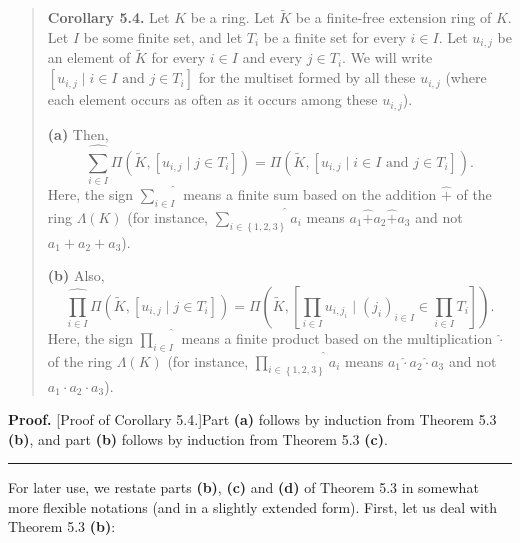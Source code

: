 \documentclass[numbers=enddot,12pt,final,onecolumn,notitlepage]{scrartcl}%
\newenvironment{proof}[1][Proof]{\noindent\textbf{#1.} }{\ \rule{0.5em}{0.5em}}
\begin{document}
\begin{quote}
\textbf{Corollary 5.4.} Let $K$ be a ring. Let $\widetilde{K}$ be a
finite-free extension ring of $K$. Let $I$ be some finite set, and let $T_{i}$
be a finite set for every $i\in I$. Let $u_{i,j}$ be an element of
$\widetilde{K}$ for every $i\in I$ and every $j\in T_{i}$. We will write
$\left[  u_{i,j}\mid i\in I\text{ and }j\in T_{i}\right]  $ for the multiset
formed by all these $u_{i,j}$ (where each element occurs as often as it occurs
among these $u_{i,j}$).

\textbf{(a)} Then,%
\[
\widehat{\sum_{i\in I}}\Pi\left(  \widetilde{K},\left[  u_{i,j}\mid j\in
T_{i}\right]  \right)  =\Pi\left(  \widetilde{K},\left[  u_{i,j}\mid i\in
I\text{ and }j\in T_{i}\right]  \right)  .
\]
Here, the sign $\widehat{\sum\limits_{i\in I}}$ means a finite sum based on
the addition $\widehat{+}$ of the ring $\Lambda\left(  K\right)  $ (for
instance, $\widehat{\sum\limits_{i\in\left\{  1,2,3\right\}  }}a_{i}$ means
$a_{1}\widehat{+}a_{2}\widehat{+}a_{3}$ and not $a_{1}+a_{2}+a_{3}$).

\textbf{(b)} Also,%
\[
\widehat{\prod_{i\in I}}\Pi\left(  \widetilde{K},\left[  u_{i,j}\mid j\in
T_{i}\right]  \right)  =\Pi\left(  \widetilde{K},\left[  \prod_{i\in
I}u_{i,j_{i}}\mid\left(  j_{i}\right)  _{i\in I}\in\prod_{i\in I}T_{i}\right]
\right)  .
\]
Here, the sign $\widehat{\prod\limits_{i\in I}}$ means a finite product based
on the multiplication $\widehat{\cdot}$ of the ring $\Lambda\left(  K\right)
$ (for instance, $\widehat{\prod\limits_{i\in\left\{  1,2,3\right\}  }}a_{i}$
means $a_{1}\widehat{\cdot}a_{2}\widehat{\cdot}a_{3}$ and not $a_{1}\cdot
a_{2}\cdot a_{3}$).
\end{quote}

\begin{proof}
[Proof of Corollary 5.4.]Part \textbf{(a)} follows by induction from Theorem
5.3 \textbf{(b)}, and part \textbf{(b)} follows by induction from Theorem 5.3
\textbf{(c)}.
\end{proof}

For later use, we restate parts \textbf{(b)}, \textbf{(c)} and \textbf{(d)} of
Theorem 5.3 in somewhat more flexible notations (and in a slightly extended
form). First, let us deal with Theorem 5.3 \textbf{(b)}:
\end{document}
